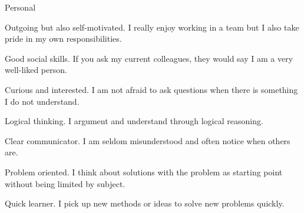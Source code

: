 \begin{cvskills}
\cvskill
{Personal} %
{
\begin{cvitems}
\item {Outgoing but also self-motivated. I really enjoy working in a team but I also take pride in my own responsibilities.}
\item {Good social skills. If you ask my current colleagues, they would say I am a very well-liked person.}
\item {Curious and interested. I am not afraid to ask questions when there is something I do not understand.}
\item {Logical thinking. I argument and understand through logical reasoning.}
\item {Clear communicator. I am seldom misunderstood and often notice when others are.}
\item {Problem oriented. I think about solutions with the problem as starting point without being limited by subject.}
\item {Quick learner. I pick up new methods or ideas to solve new problems quickly.}
\end{cvitems}} %




\end{cvskills}
